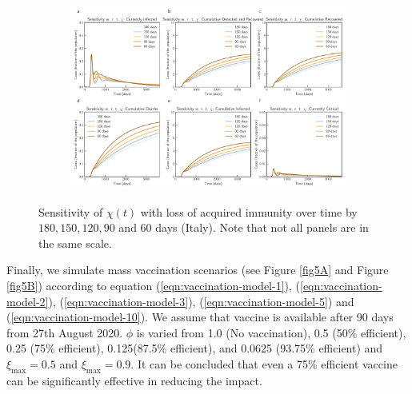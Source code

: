 \documentclass[10pt]{wlscirep}
\begin{document}
%
\begin{figure}[!htb]
	\centering
	\begin{subfigure}[b]{0.7\textwidth}
		\centering
		\includegraphics[width=1\linewidth]{Italy_scenario_reinfection.pdf}
	\end{subfigure}
	\caption{Sensitivity of $\chi(t)$ with loss of acquired immunity over time by $180, 150, 120, 90$ and $60$ days (Italy). Note that not all panels are in the same scale.}
	\label{fig4} 
\end{figure}
%

Finally, we simulate mass vaccination scenarios (see Figure \ref{fig5A} and Figure \ref{fig5B}) according to equation (\ref{eqn:vaccination-model-1}), (\ref{eqn:vaccination-model-2}), (\ref{eqn:vaccination-model-3}), (\ref{eqn:vaccination-model-5}) and (\ref{eqn:vaccination-model-10}). We assume that vaccine is available after 90 days from 27th August 2020. $\phi$ is varied from 1.0 (No vaccination), 0.5 (50\% efficient), 0.25 (75\% efficient), 0.125(87.5\% efficient), and 0.0625 (93.75\% efficient) and $\xi_{\max} = 0.5$ and $\xi_{\max} = 0.9$. It can be concluded that even a 75\% efficient vaccine can be significantly effective in reducing the impact.
\end{document}
